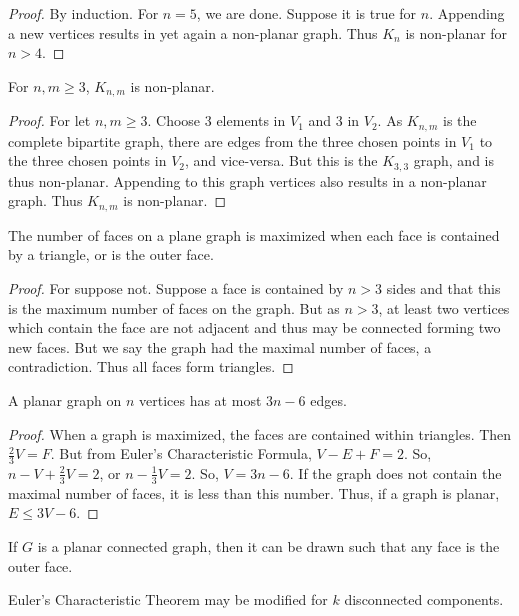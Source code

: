        \begin{proof}
        By induction. For $n=5$, we are done. Suppose it is true for $n$. Appending a new vertices results in yet again a non-planar graph. Thus $K_n$ is non-planar for $n>4$.
        \end{proof}
        \begin{theorem}
        For $n,m\geq 3$, $K_{n,m}$ is non-planar.
        \end{theorem}
        \begin{proof}
        For let $n,m\geq 3$. Choose $3$ elements in $V_1$ and $3$ in $V_2$. As $K_{n,m}$ is the complete bipartite graph, there are edges from the three chosen points in $V_1$ to the three chosen points in $V_2$, and vice-versa. But this is the $K_{3,3}$ graph, and is thus non-planar. Appending to this graph vertices also results in a non-planar graph. Thus $K_{n,m}$ is non-planar.
        \end{proof}
        \begin{theorem}
        The number of faces on a plane graph is maximized when each face is contained by a triangle, or is the outer face.
        \end{theorem}
        \begin{proof}
        For suppose not. Suppose a face is contained by $n>3$ sides and that this is the maximum number of faces on the graph. But as $n>3$, at least two vertices which contain the face are not adjacent and thus may be connected forming two new faces. But we say the graph had the maximal number of faces, a contradiction. Thus all faces form triangles.
        \end{proof}
        \begin{theorem}
        A planar graph on $n$ vertices has at most $3n-6$ edges.
        \end{theorem}
        \begin{proof}
        When a graph is maximized, the faces are contained within triangles. Then $\frac{2}{3}V= F$. But from Euler's Characteristic Formula, $V-E+F=2$. So, $n-V+\frac{2}{3}V = 2$, or $n-\frac{1}{3}V = 2$. So, $V=3n-6$. If the graph does not contain the maximal number of faces, it is less than this number. Thus, if a graph is planar, $E\leq 3V-6$.
        \end{proof}
        \begin{theorem}
        If $G$ is a planar connected graph, then it can be drawn such that any face is the outer face.
        \end{theorem}
        \begin{theorem}
        Euler's Characteristic Theorem may be modified for $k$ disconnected components.
        \end{theorem}

